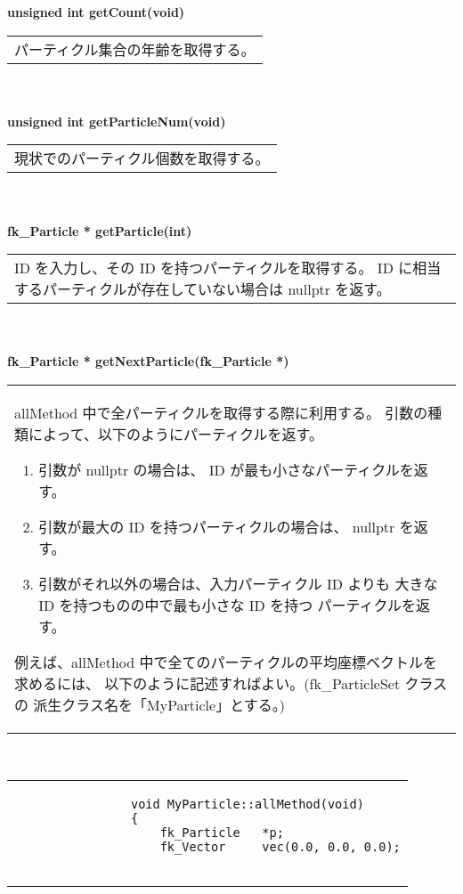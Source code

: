 \begin{tabbing}
\> \textbf{unsigned int getCount(void)} \\
	\> \> \begin{tabular}{p{15cm}}
		パーティクル集合の年齢を取得する。
	\end{tabular} \\ \\

\> \textbf{unsigned int getParticleNum(void)} \\
	\> \> \begin{tabular}{p{15cm}}
		現状でのパーティクル個数を取得する。
	\end{tabular} \\ \\

\> \textbf{fk\_Particle * getParticle(int)} \\
	\> \> \begin{tabular}{p{15cm}}
		ID を入力し、その ID を持つパーティクルを取得する。
		ID に相当するパーティクルが存在していない場合は nullptr を返す。
	\end{tabular} \\ \\

\> \textbf{fk\_Particle * getNextParticle(fk\_Particle *)} \\
	\> \> \begin{tabular}{p{15cm}}
		allMethod 中で全パーティクルを取得する際に利用する。
		引数の種類によって、以下のようにパーティクルを返す。
		\begin{enumerate}
		 \item 引数が nullptr の場合は、
			ID が最も小さなパーティクルを返す。
		 \item 引数が最大の ID を持つパーティクルの場合は、
			nullptr を返す。
		 \item 引数がそれ以外の場合は、入力パーティクル ID よりも
			大きな ID を持つものの中で最も小さな ID を持つ
			パーティクルを返す。
		\end{enumerate}
		例えば、allMethod 中で全てのパーティクルの平均座標ベクトルを
		求めるには、
		以下のように記述すればよい。(fk\_ParticleSet クラスの
		派生クラス名を「MyParticle」とする。)
	\end{tabular} \\
	\> \> \begin{tabular}{p{15cm}}
		\begin{screen}
		\begin{verbatim}
		        void MyParticle::allMethod(void)
		        {
		            fk_Particle   *p;
		            fk_Vector     vec(0.0, 0.0, 0.0);


\end{verbatim}
\end{screen}
\end{tabular}
\end{tabbing}
